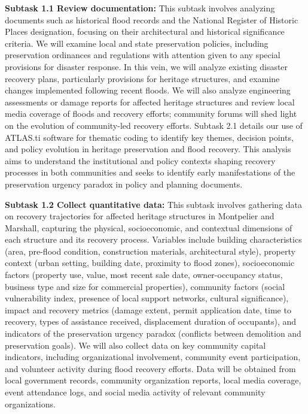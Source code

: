 \documentclass[11pt]{article}
\begin{document}
\textbf{Subtask 1.1 Review documentation:}
This subtask involves analyzing documents such as historical flood records and the National Register of Historic Places designation, focusing on their architectural and historical significance criteria. 
We will examine local and state preservation policies, including preservation ordinances and regulations with attention given to any special provisions for disaster response. 
In this vein, we will analyze existing disaster recovery plans, particularly provisions for heritage structures, and examine changes implemented following recent floods. 
We will also analyze engineering assessments or damage reports for affected heritage structures and review local media coverage of floods and recovery efforts; community forums will shed light on the evolution of community-led recovery efforts.
Subtask 2.1 details our use of ATLAS.ti software for thematic coding to identify key themes, decision points, and policy evolution in heritage preservation and flood recovery. 
This analysis aims to understand the institutional and policy contexts shaping recovery processes in both communities and seeks to identify early manifestations of the preservation urgency paradox in policy and planning documents.

\textbf{Subtask 1.2 Collect quantitative data:}
This subtask involves gathering data on recovery trajectories for affected heritage structures in Montpelier and Marshall, capturing the physical, socioeconomic, and contextual dimensions of each structure and its recovery process.
Variables include building characteristics (area, pre-flood condition, construction materials, architectural style), property context (urban setting, building date, proximity to flood zones), socioeconomic factors (property use, value, most recent sale date, owner-occupancy status, business type and size for commercial properties), community factors (social vulnerability index, presence of local support networks, cultural significance), impact and recovery metrics (damage extent, permit application date, time to recovery, types of assistance received, displacement duration of occupants), and indicators of the preservation urgency paradox (conflicts between demolition and preservation goals). 
We will also collect data on key community capital indicators, including organizational involvement, community event participation, and volunteer activity during flood recovery efforts. 
Data will be obtained from local government records, community organization reports, local media coverage, event attendance logs, and social media activity of relevant community organizations.
\end{document}
